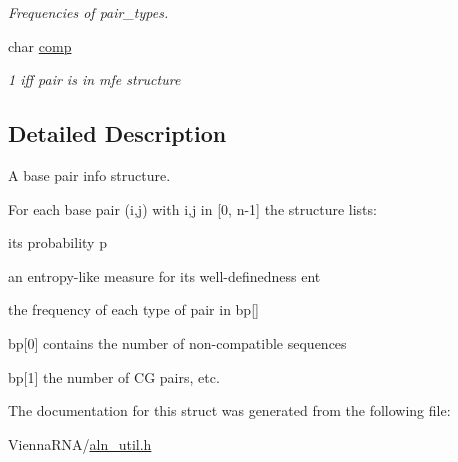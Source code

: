 \begin{DoxyCompactItemize}
\begin{DoxyCompactList}\small\item\em Frequencies of pair\+\_\+types. \end{DoxyCompactList}\item 
char \hyperlink{structvrna__pinfo__s_a0720ae74ce53802a759ee9f98e9c8c43}{comp}\hypertarget{structvrna__pinfo__s_a0720ae74ce53802a759ee9f98e9c8c43}{}\label{structvrna__pinfo__s_a0720ae74ce53802a759ee9f98e9c8c43}

\begin{DoxyCompactList}\small\item\em 1 iff pair is in mfe structure \end{DoxyCompactList}\end{DoxyCompactItemize}


\subsection{Detailed Description}
A base pair info structure. 

For each base pair (i,j) with i,j in \mbox{[}0, n-\/1\mbox{]} the structure lists\+:
\begin{DoxyItemize}
\item its probability \textquotesingle{}p\textquotesingle{}
\item an entropy-\/like measure for its well-\/definedness \textquotesingle{}ent\textquotesingle{}
\item the frequency of each type of pair in \textquotesingle{}bp\mbox{[}\mbox{]}\textquotesingle{}
\begin{DoxyItemize}
\item \textquotesingle{}bp\mbox{[}0\mbox{]}\textquotesingle{} contains the number of non-\/compatible sequences
\item \textquotesingle{}bp\mbox{[}1\mbox{]}\textquotesingle{} the number of CG pairs, etc. 
\end{DoxyItemize}
\end{DoxyItemize}

The documentation for this struct was generated from the following file\+:\begin{DoxyCompactItemize}
\item 
Vienna\+R\+N\+A/\hyperlink{aln__util_8h}{aln\+\_\+util.\+h}\end{DoxyCompactItemize}
